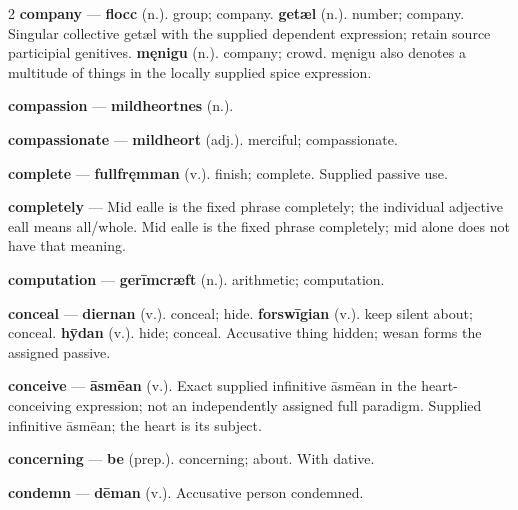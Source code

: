 \begin{multicols}{2}
\textbf{company} — \textbf{flocc} (n.). group; company. \textbf{getæl} (n.). number; company. Singular collective getæl with the supplied dependent expression; retain source participial genitives. \textbf{męnigu} (n.). company; crowd. męnigu also denotes a multitude of things in the locally supplied spice expression.\par
\textbf{compassion} — \textbf{mildheortnes} (n.).\par
\textbf{compassionate} — \textbf{mildheort} (adj.). merciful; compassionate.\par
\textbf{complete} — \textbf{fullfręmman} (v.). finish; complete. Supplied passive use.\par
\textbf{completely} — Mid ealle is the fixed phrase completely; the individual adjective eall means all/whole. Mid ealle is the fixed phrase completely; mid alone does not have that meaning.\par
\textbf{computation} — \textbf{gerīmcræft} (n.). arithmetic; computation.\par
\textbf{conceal} — \textbf{diernan} (v.). conceal; hide. \textbf{forswīgian} (v.). keep silent about; conceal. \textbf{hȳdan} (v.). hide; conceal. Accusative thing hidden; wesan forms the assigned passive.\par
\textbf{conceive} — \textbf{āsmēan} (v.). Exact supplied infinitive āsmēan in the heart-conceiving expression; not an independently assigned full paradigm. Supplied infinitive āsmēan; the heart is its subject.\par
\textbf{concerning} — \textbf{be} (prep.). concerning; about. With dative.\par
\textbf{condemn} — \textbf{dēman} (v.). Accusative person condemned.\par

\end{multicols}
